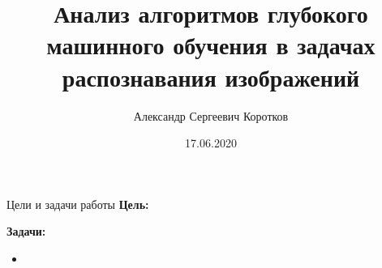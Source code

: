 \documentclass{beamer}
\title{Анализ алгоритмов глубокого машинного обучения  в задачах распознавания изображений}
\author[Коротков А.С.]{Александр Сергеевич Коротков}
\institute[]{Научный руководитель: Д.\,В.~Матвеев}
\date{17.06.2020}
\begin{document}
\maketitle
\begin{frame}{Цели и задачи работы}
    \textbf{Цель: }

    \textbf{Задачи: }
    \begin{itemize}
        \item 
    \end{itemize}
\end{frame}
\end{document}
